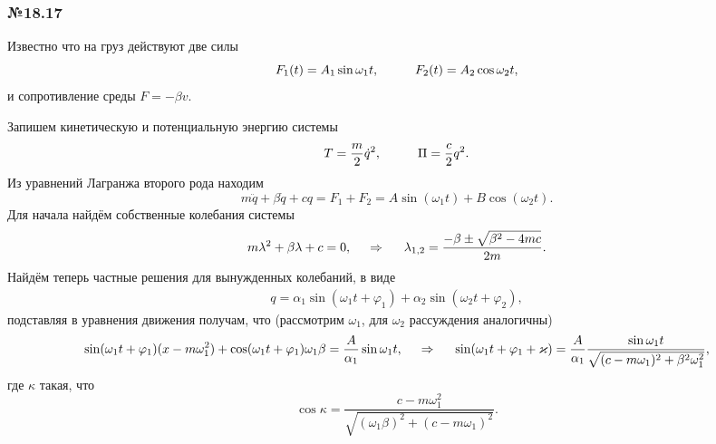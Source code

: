 \subsubsection*{№18.17}


Известно что на груз действуют две силы
\begin{equation*}
    F_1 (t) = A_1 \sin \omega_1 t,
    \hspace{1 cm}
    F_2 (t) = A_2 \cos \omega_2 t,
\end{equation*}
и сопротивление среды $F = - \beta v$. 

Запишем кинетическую и потенциальную энергию системы
\begin{equation*}
    T = \frac{m}{2} \dot{q}^2, \hspace{1 cm}
    \Pi = \frac{c}{2}q^2.
\end{equation*}
Из уравнений Лагранжа второго рода находим
\begin{equation*}
    m \ddot{q} + \beta \dot{q} + c q = F_1 + F_2 = A \sin (\omega_1 t) + B \cos (\omega_2 t).
\end{equation*}
Для начала найдём собственные колебания системы
\begin{equation*}
    m \lambda^2 + \beta \lambda + c = 0,
    \hspace{0.5cm} \Rightarrow \hspace{0.5cm}
    \lambda_{1, 2} = \frac{-\beta \pm \sqrt{\beta^2 - 4 mc}}{2m}.
\end{equation*}
Найдём теперь частные решения для вынужденных колебаний, в виде
\begin{align*}
    q = \alpha_1 \sin (\omega_1 t + \varphi_1) + \alpha_2 \sin (\omega_2 t + \varphi_2),
\end{align*}
подставляя в уравнения движения получам, что (рассмотрим $\omega_1$, для $\omega_2$ рассуждения аналогичны)
\begin{equation*}
    \sin (\omega_1 t + \varphi_1) (x - m \omega_1^2) + \cos (\omega_1 t + \varphi_1) \omega_1 \beta = \frac{A}{\alpha_1}\sin \omega_1 t,
    \hspace{0.5cm} \Rightarrow \hspace{0.5cm}
    \sin(\omega_1 t + \varphi_1 + \kappa) = \frac{A}{\alpha_1} \frac{\sin \omega_1 t}{\sqrt{
    (c-m \omega_1)^2 + \beta^2 \omega_1^2
    }},
\end{equation*}
где $\kappa$ такая, что
\begin{equation*}
    \cos \kappa = \frac{c - m \omega_1^2}{\sqrt{
        (\omega_1 \beta)^2 + (c-m \omega_1)^2
    }}.
\end{equation*}
